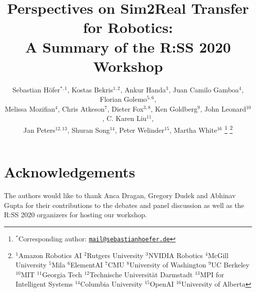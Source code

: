 \documentclass[letterpaper, 10 pt, conference]{ieeeconf}
\title{\LARGE \bf Perspectives on Sim2Real Transfer for Robotics:\\A Summary of the R:SS 2020 Workshop}
\author{Sebastian Höfer$^{*,1}$, Kostas Bekris$^{1,2}$, Ankur Handa$^3$, Juan Camilo Gamboa$^{4}$, Florian Golemo$^{5,6}$, \\
Melissa Mozifian$^{4}$,
Chris Atkeson$^{7}$, Dieter Fox$^{3,8}$, Ken Goldberg$^{9}$, John Leonard$^{10}$, C. Karen Liu$^{11}$, \\
Jan Peters$^{12,13}$, Shuran Song$^{14}$, Peter Welinder$^{15}$, Martha White$^{16}$
\thanks{
$^{*}$Corresponding author: \href{mailto:mail@sebastianhoefer.de}{\texttt{mail@sebastianhoefer.de}}
}
\thanks{
$^1$Amazon Robotics AI
$^2$Rutgers University
$^3$NVIDIA Robotics
$^4$McGill University
$^5$Mila
$^6$ElementAI
${^7}$CMU
${^8}$University of Washington 
${^9}$UC Berkeley
$^{10}$MIT
$^{11}$Georgia Tech
$^{12}$Technische Universität Darmstadt
$^{13}$MPI for Intelligent Systems
$^{14}$Columbia University
$^{15}$OpenAI
$^{16}$University of Alberta
}
}
\begin{document}
\maketitle
\thispagestyle{empty}
\pagestyle{empty}



\setcounter{footnote}{16}











\section*{Acknowledgements}
The authors would like to thank Anca Dragan, Gregory Dudek and Abhinav Gupta for their contributions to the debates and panel discussion as well as the R:SS 2020 organizers for hosting our workshop.
{


}
\end{document}
